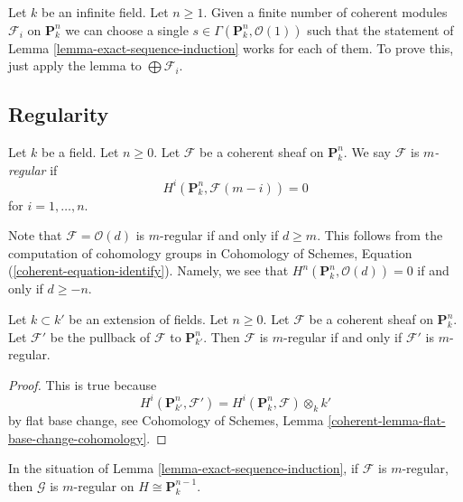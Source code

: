 \begin{remark}
\label{remark-exact-sequence-induction}
Let $k$ be an infinite field. Let $n \geq 1$. Given a finite number
of coherent modules $\mathcal{F}_i$ on $\mathbf{P}^n_k$ we can choose
a single $s \in \Gamma(\mathbf{P}^n_k, \mathcal{O}(1))$ such
that the statement of Lemma \ref{lemma-exact-sequence-induction}
works for each of them.
To prove this, just apply the lemma to $\bigoplus \mathcal{F}_i$.
\end{remark}


\subsection{Regularity}
\label{subsection-regularity}

\begin{definition}
\label{definition-regularity}
Let $k$ be a field. Let $n \geq 0$. Let $\mathcal{F}$ be a coherent
sheaf on $\mathbf{P}^n_k$. We say $\mathcal{F}$ is {\it $m$-regular}
if
$$
H^i(\mathbf{P}^n_k, \mathcal{F}(m - i)) = 0
$$
for $i = 1, \ldots, n$.
\end{definition}

\noindent
Note that $\mathcal{F} = \mathcal{O}(d)$ is $m$-regular if and only
if $d \geq m$. This follows from the computation of cohomology groups
in Cohomology of Schemes, Equation (\ref{coherent-equation-identify}).
Namely, we see that $H^n(\mathbf{P}^n_k, \mathcal{O}(d)) = 0$
if and only if $d \geq -n$.

\begin{lemma}
\label{lemma-m-regular-extend-base-field}
Let $k \subset k'$ be an extension of fields. Let $n \geq 0$.
Let $\mathcal{F}$ be a coherent sheaf on $\mathbf{P}^n_k$.
Let $\mathcal{F}'$ be the pullback of $\mathcal{F}$ to $\mathbf{P}^n_{k'}$.
Then $\mathcal{F}$ is $m$-regular if and only if $\mathcal{F}'$ is
$m$-regular.
\end{lemma}

\begin{proof}
This is true because
$$
H^i(\mathbf{P}^n_{k'}, \mathcal{F}') =
H^i(\mathbf{P}^n_k, \mathcal{F}) \otimes_k k'
$$
by flat base change, see
Cohomology of Schemes, Lemma \ref{coherent-lemma-flat-base-change-cohomology}.
\end{proof}

\begin{lemma}
\label{lemma-m-regular}
In the situation of Lemma \ref{lemma-exact-sequence-induction},
if $\mathcal{F}$ is $m$-regular, then $\mathcal{G}$ is $m$-regular
on $H \cong \mathbf{P}^{n - 1}_k$.
\end{lemma}

